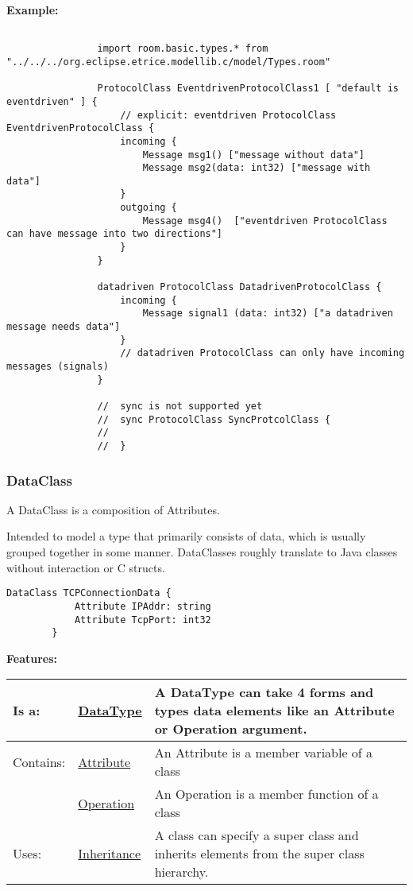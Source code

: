 		\textbf{Example:}
		
				\begin{lstlisting}[language=ROOM]
			
				import room.basic.types.* from "../../../org.eclipse.etrice.modellib.c/model/Types.room"
			
				ProtocolClass EventdrivenProtocolClass1 [ "default is eventdriven" ] {
					// explicit: eventdriven ProtocolClass EventdrivenProtocolClass {
					incoming {
						Message msg1() ["message without data"]
						Message msg2(data: int32) ["message with data"]
					}
					outgoing {
						Message msg4()  ["eventdriven ProtocolClass can have message into two directions"]
					}
				}
			
				datadriven ProtocolClass DatadrivenProtocolClass {
					incoming {
						Message signal1 (data: int32) ["a datadriven message needs data"]
					}
					// datadriven ProtocolClass can only have incoming messages (signals)
				}
				
				//  sync is not supported yet
				//	sync ProtocolClass SyncProtcolClass { 
				//		
				//	}
				\end{lstlisting}
	
	\vspace{\baselineskip}
	\vspace{\baselineskip}
	\vspace{\baselineskip}
	
	\subsubsection{DataClass}
		\hypertarget{ref:DataClass}{}
		
		A DataClass is a composition of Attributes.
		
		Intended to model a type that primarily consists of data, which is usually grouped together in some manner. DataClasses roughly translate to Java classes without interaction or C \textsf{struct}s.
		
		\begin{lstlisting}[language=ROOM]		
		DataClass TCPConnectionData {
			Attribute IPAddr: string
			Attribute TcpPort: int32
		}
		\end{lstlisting}
		
		
		\begingroup
		\textbf{Features:}
		\renewcommand{\arraystretch}{1.8} %
		\begin{longtable}{l|l p{}}
			\hline
		Is a: & \tabitem \hyperlink{ref:DataType}{DataType}  & A DataType can take 4 forms and types data elements like an Attribute or Operation argument.\\
		\hline
		Contains: & \tabitem \hyperlink{ref:Attribute}{Attribute}  & An Attribute is a member variable of a class\\
		& \tabitem \hyperlink{ref:Operation}{Operation}  & An Operation is a member function of a class \\
		\hline
		Uses: & \tabitem \hyperlink{ref:Inheritance}{Inheritance}  & A class can specify a super class and inherits elements from the super class hierarchy.\\
		\hline
		\end{longtable}
		\endgroup
		
